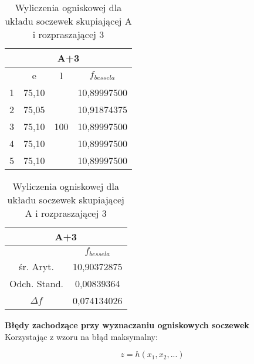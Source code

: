 \documentclass{article}
\begin{document}
\begin{table}[!ht]
    \centering
    \begin{tabular}{|c|c|c|c|}
    \hline
            \multicolumn{4}{|c|}{A+3}\\\hline
        & e & l & $f_{bessela}$ \\ \hline
        1 & 75,10 & \multirow{5}{*}{100} & 10,89997500 \\ \cline{1-2} \cline{4-4}
        2 & 75,05 &  & 10,91874375 \\ \cline{1-2} \cline{4-4}
        3 & 75,10 &  & 10,89997500 \\ \cline{1-2} \cline{4-4}
        4 & 75,10 &  & 10,89997500 \\ \cline{1-2} \cline{4-4}
        5 & 75,10 &  & 10,89997500 \\ \hline
    \end{tabular}
    \begin{tabular}{|c|c|}
    \hline
            \multicolumn{2}{|c|}{A+3}\\\hline
        & $f_{bessela}$ \\ \hline
        śr. Aryt. & 10,90372875 \\ \hline
        Odch. Stand. & 0,00839364 \\ \hline
        $\Delta f$ & 0,074134026 \\ \hline
    \end{tabular}
        \caption{Wyliczenia ogniskowej dla układu soczewek skupiającej A i rozpraszającej 3}
    \label{tab:Wyl_6}
\end{table}

\FloatBarrier

\textbf{Błędy zachodzące przy wyznaczaniu ogniskowych soczewek}\\
Korzystając z wzoru na błąd maksymalny:

\[z = h(x_1, x_2, ...)\]
\end{document}
